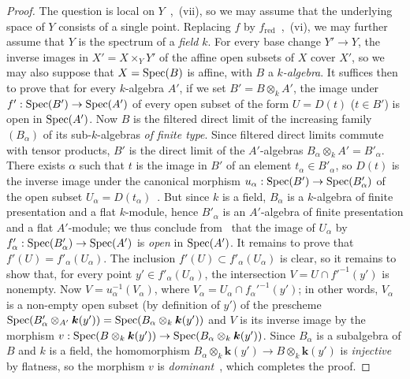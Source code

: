 \begin{proof}
The question is local on $Y$~,~(vii), so we may assume that the underlying space of $Y$ consists of a single point. Replacing $f$ by $f_{\mathrm{red}}$~,~(vi), we may further assume that $Y$ is the spectrum of a \emph{field} $k$. For every base change $Y'\to Y$, the inverse images in $X'=X\times_Y Y'$ of the affine open subsets of $X$ cover $X'$, so we may also suppose that $X=\operatorname{Spec}(B)$ is affine, with $B$ a \emph{$k$-algebra}.
It suffices then to prove that for every $k$-algebra $A'$, if we set $B'=B\otimes_k A'$, the image under $f':\operatorname{Spec}(B')\to\operatorname{Spec}(A')$ of every open subset of the form $U=D(t)$ ($t\in B'$) is open in $\operatorname{Spec}(A')$.
Now $B$ is the filtered direct limit of the increasing family $(B_\alpha)$ of its sub-$k$-algebras \emph{of finite type}. Since filtered direct limits commute with tensor products, $B'$ is the direct limit of the $A'$-algebras $B_\alpha\otimes_k A'=B'_\alpha$.
There exists $\alpha$ such that $t$ is the image in $B'$ of an element $t_\alpha\in B'_\alpha$, so $D(t)$ is the inverse image under the canonical morphism $u_\alpha:\operatorname{Spec}(B')\to\operatorname{Spec}(B'_\alpha)$ of the open subset $U_\alpha=D(t_\alpha)$~.
But since $k$ is a field, $B_\alpha$ is a $k$-algebra of finite presentation and a flat $k$-module, hence $B'_\alpha$ is an $A'$-algebra of finite presentation and a flat $A'$-module; we thus conclude from~ that the image of $U_\alpha$ by $f'_\alpha:\operatorname{Spec}(B'_\alpha)\to\operatorname{Spec}(A')$ is \emph{open} in $\operatorname{Spec}(A')$.
It remains to prove that $f'(U)=f'_\alpha(U_\alpha)$. The inclusion $f'(U)\subset f'_\alpha(U_\alpha)$ is clear, so it remains to show that, for every point $y'\in f'_\alpha(U_\alpha)$, the intersection $V=U\cap f'^{-1}(y')$ is nonempty.
Now $V=u_\alpha^{-1}(V_\alpha)$, where $V_\alpha=U_\alpha\cap f_\alpha'^{-1}(y')$; in other words, $V_\alpha$ is a non-empty open subset (by definition of $y'$) of the prescheme $\operatorname{Spec}(B'_\alpha\otimes_{A'}\boldsymbol{k}(y'))=\operatorname{Spec}(B_\alpha\otimes_k \boldsymbol{k}(y'))$ and $V$ is its inverse image by the morphism $v:\operatorname{Spec}(B\otimes_k \boldsymbol{k}(y'))\to\operatorname{Spec}(B_\alpha\otimes_k \boldsymbol{k}(y'))$.
  Since $B_\alpha$ is a subalgebra of $B$ and $k$ is a field, the homomorphism
  $B_\alpha\otimes_k \boldsymbol{k}(y')\to B\otimes_k \boldsymbol{k}(y')$ is \emph{injective} by flatness,
  so the morphism $v$ is \emph{dominant}~, which completes the proof.
\end{proof}

